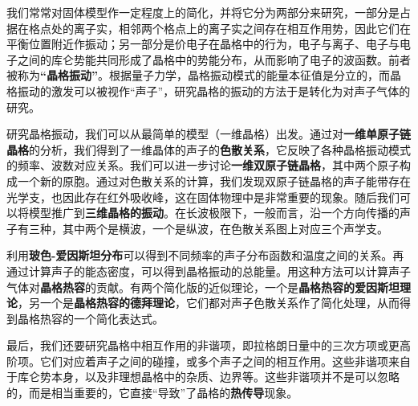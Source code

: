 
我们常常对固体模型作一定程度上的简化，并将它分为两部分来研究，一部分是占据在格点处的离子实，相邻两个格点上的离子实之间存在相互作用势，因此它们在平衡位置附近作振动；另一部分是价电子在晶格中的行为，电子与离子、电子与电子之间的库仑势能共同形成了晶格中的势能分布，从而影响了电子的波函数。前者被称为\textbf{“晶格振动”}。根据量子力学，晶格振动模式的能量本征值是分立的，而晶格振动的激发可以被视作“声子”，研究晶格的振动的方法于是转化为对声子气体的研究。

研究晶格振动，我们可以从最简单的模型（一维晶格）出发。通过对\textbf{一维单原子链晶格}的分析，我们得到了一维晶体的声子的\textbf{色散关系}，它反映了各种晶格振动模式的频率、波数对应关系。我们可以进一步讨论\textbf{一维双原子链晶格}，其中两个原子构成一个新的原胞。通过对色散关系的计算，我们发现双原子链晶格的声子能带存在光学支，也因此存在红外吸收峰，这在固体物理中是非常重要的现象。随后我们可以将模型推广到\textbf{三维晶格的振动}。在长波极限下，一般而言，沿一个方向传播的声子有三种，其中两个是横波，一个是纵波，在色散关系图上对应三个声学支。

利用\textbf{玻色-爱因斯坦分布}可以得到不同频率的声子分布函数和温度之间的关系。再通过计算声子的能态密度，可以得到晶格振动的总能量。用这种方法可以计算声子气体对\textbf{晶格热容}的贡献。有两个简化版的近似理论，一个是\textbf{晶格热容的爱因斯坦理论}，另一个是\textbf{晶格热容的德拜理论}，它们都对声子色散关系作了简化处理，从而得到晶格热容的一个简化表达式。

最后，我们还要研究晶格中相互作用的非谐项，即拉格朗日量中的三次方项或更高阶项。它们对应着声子之间的碰撞，或多个声子之间的相互作用。这些非谐项来自于库仑势本身，以及非理想晶格中的杂质、边界等。这些非谐项并不是可以忽略的，而是相当重要的，它直接“导致”了晶格的\textbf{热传导}现象。